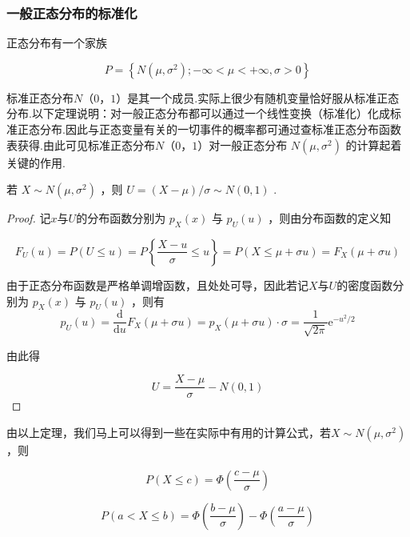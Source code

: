 \subsubsection{一般正态分布的标准化}

正态分布有一个家族

\[
P=\left\{N\left(\mu, \sigma^{2}\right) ;-\infty<\mu<+\infty, \sigma>0\right\}
\]

标准正态分布$ N（0，1） $是其一个成员.实际上很少有随机变量恰好服从标准正态分布.以下定理说明：对一般正态分布都可以通过一个线性变换（标准化）化成标准正态分布.因此与正态变量有关的一切事件的概率都可通过查标准正态分布函数表获得.由此可见标准正态分布$ N（0，1 $）对一般正态分布 $N\left(\mu, \sigma^{2}\right)$ 的计算起着关键的作用.

\begin{theorem}{}{}
	若 $X \sim N\left(\mu, \sigma^{2}\right)$ ，则 $U=(X-\mu) / \sigma \sim N(0,1)$ .
\end{theorem}

\begin{proof}
	记$ x $与$ U $的分布函数分别为 $p_{X}(x)$ 与 $p_{U}(u)$ ，则由分布函数的定义知
	
	\[
	F_{U}(u)=P(U \leqslant u)=P\left\{\frac{X-u}{\sigma} \leqslant u\right\}=P(X \leqslant \mu+\sigma u)=F_{X}(\mu+\sigma u)
	\]
	
	由于正态分布函数是严格单调增函数，且处处可导，因此若记$ X $与$ U $的密度函数分别为 $p_{X}(x)$ 与 $p_{U}(u)$ ，则有
	\[
	p_{U}(u)=\frac{\mathrm{d}}{\mathrm{d} u} F_{X}(\mu+\sigma u)=p_{X}(\mu+\sigma u) \cdot \sigma=\frac{1}{\sqrt{2 \pi}} \mathrm{e}^{-u^{2} / 2}
	\]
	
	由此得
	
	\[
	U=\frac{X-\mu}{\sigma}-N(0,1)
	\]
\end{proof}


由以上定理，我们马上可以得到一些在实际中有用的计算公式，若$X \sim N\left(\mu, \sigma^{2}\right) $ ，则

\begin{equation}
P(X \leqslant c)=\Phi\left(\frac{c-\mu}{\sigma}\right) \label{eq:2.5.3}
\end{equation}

\begin{equation}
P(a<X \leqslant b)=\Phi\left(\frac{b-\mu}{\sigma}\right)-\Phi\left(\frac{a-\mu}{\sigma}\right) \label{eq:2.5.4}
\end{equation}

